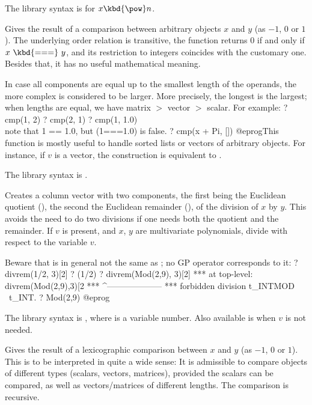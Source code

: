 The library syntax is 
for $x\hbox{\kbd{\pow}}n$.


\label{se:cmp}
Gives the result of a comparison between arbitrary objects $x$ and $y$
(as $-1$, $0$ or $1$). The underlying order relation is transitive,
the function returns $0$ if and only if $x~\kbd{===}~y$, and its
restriction to integers coincides with the customary one. Besides that,
it has no useful mathematical meaning.

In case all components are equal up to the smallest length of the operands,
the more complex is considered to be larger. More precisely, the longest is
the largest; when lengths are equal, we have matrix $>$ vector $>$ scalar.
For example:
\bprog
? cmp(1, 2)
? cmp(2, 1)
? cmp(1, 1.0)   \\ note that 1 == 1.0, but (1===1.0) is false.
? cmp(x + Pi, [])
@eprog\noindent This function is mostly useful to handle sorted lists or
vectors of arbitrary objects. For instance, if $v$ is a vector, the
construction  is equivalent to .

The library syntax is .

\label{se:divrem}
Creates a column vector with two components, the first being the Euclidean
quotient (), the second the Euclidean remainder
(), of the division of $x$ by $y$. This avoids the
need to do two divisions if one needs both the quotient and the remainder.
If $v$ is present, and $x$, $y$ are multivariate
polynomials, divide with respect to the variable $v$.

Beware that  is in general not the same as
; no GP operator corresponds to it:
\bprog
? divrem(1/2, 3)[2]
? (1/2) %
? divrem(Mod(2,9), 3)[2]
 ***   at top-level: divrem(Mod(2,9),3)[2
 ***                 ^--------------------
 ***   forbidden division t_INTMOD \ t_INT.
? Mod(2,9) %
@eprog

The library syntax is , where  is a variable number.
Also available is  when $v$ is
not needed.

\label{se:lex}
Gives the result of a lexicographic comparison
between $x$ and $y$ (as $-1$, $0$ or $1$). This is to be interpreted in quite
a wide sense: It is admissible to compare objects of different types
(scalars, vectors, matrices), provided the scalars can be compared, as well
as vectors/matrices of different lengths. The comparison is recursive.

